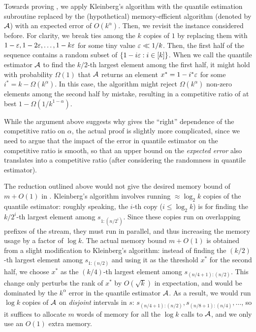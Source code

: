 Towards proving , we apply Kleinberg's algorithm with the quantile estimation subroutine replaced by the (hypothetical) memory-efficient algorithm (denoted by $\mathcal{A}$) with an expected error of $O(k^{\alpha})$. Then, we revisit the instance considered before. For clarity, we break ties among the $k$ copies of $1$ by replacing them with $1 - \varepsilon, 1 - 2\varepsilon, \ldots, 1 - k\varepsilon$ for some tiny value $\varepsilon \ll 1/k$. Then, the first half of the sequence contains a random subset of $\{1 - i\varepsilon: i \in [k]\}$. When we call the quantile estimator $\mathcal{A}$ to find the $k/2$-th largest element among the first half, it might hold with probability $\Omega(1)$ that $\mathcal{A}$ returns an element $x^* = 1 - i^*\varepsilon$ for some $i^* = k - \Omega(k^{\alpha})$. In this case, the algorithm might reject $\Omega(k^{\alpha})$ non-zero elements among the second half by mistake, resulting in a competitive ratio of at best $1 - \Omega(1/k^{1-\alpha})$.

While the argument above suggests why  gives the ``right'' dependence of the competitive ratio on $\alpha$, the actual proof is slightly more complicated, since we need to argue that the impact of the error in quantile estimator on the competitive ratio is smooth, so that an upper bound on the \emph{expected error} also translates into a competitive ratio (after considering the randomness in quantile estimator).

The reduction outlined above would not give the desired memory bound of $m + O(1)$ in . Kleinberg's algorithm involves running $\approx \log_2 k$ copies of the quantile estimator: roughly speaking, the $i$-th copy ($i \le \log_2 k$) is for finding the $k/2^i$-th largest element among $s_{1:(n/2^i)}$. Since these copies run on overlapping prefixes of the stream, they must run in parallel, and thus increasing the memory usage by a factor of $\log k$. The actual memory bound $m + O(1)$ is obtained from a slight modification to Kleinberg's algorithm: instead of finding the $(k/2)$-th largest element among $s_{1:(n/2)}$ and using it as the threshold $x^*$ for the second half, we choose $x^*$ as the $(k/4)$-th largest element among $s_{(n/4+1):(n/2)}$. This change only perturbs the rank of $x^*$ by $O(\sqrt{k})$ in expectation, and would be dominated by the $k^{\alpha}$ error in the quantile estimator $\mathcal{A}$. As a result, we would run $\log k$ copies of $\mathcal{A}$ on \emph{disjoint} intervals in $s$: $s_{(n/4+1):(n/2)}, s_{(n/8+1):(n/4)}, \ldots$, so it suffices to allocate $m$ words of memory for all the $\log k$ calls to $\mathcal{A}$, and we only use an $O(1)$ extra memory.